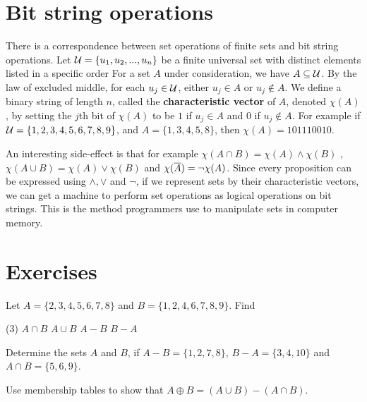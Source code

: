 \section{Bit string operations}
There is a correspondence between set operations of finite sets and bit string
operations. Let ${\cal {U}}=\{u_1, u_2, ..., u_n\}$ be a finite universal set with distinct 
elements listed in a specific  order
For a set $A$ under consideration, we have $A\subseteq {\cal {U}}$. By the law of excluded 
middle, for each $u_j\in {\cal {U}}$,
either $u_j\in A$ or $u_j\not\in A$. We define a binary string of length $n$, called 
the { \bfseries characteristic vector}\label{defn:char vector}
of $A$, denoted $\chi(A)$, by setting the $j$th bit of $\chi(A)$ to be $1$ if $u_j\in A$ 
and $0$ if $u_j\not\in A$.
For example if ${\cal {U}}=\{1,2,3,4,5,6,7,8,9\}$, and $A=\{1,3,4,5,8\}$, then $\chi(A)=101110010$. 

An interesting side-effect is that for example $\chi(A\cap B)=\chi(A)\wedge \chi(B)$ %
,
$\chi(A\cup B)=\chi(A)\vee \chi(B)$ and $\chi(\overline{A})=\neg \chi(A)$. Since 
every proposition can be expressed using $\wedge, \vee$ and $\neg$, 
if we represent sets by their characteristic vectors, 
we can get a machine
to perform set operations as logical operations on bit strings. This is the method programmers use
to manipulate sets in computer memory.

\clearpage



\section{Exercises}

\begin{exer}
Let $A=\{2,3,4,5,6,7,8\}$ and $B=\{1,2,4,6,7,8,9\}$. Find 
\begin{tasks}(3)
	\task $A\cap B$
	\task $A\cup B$
	\task $A-B$
	\task $B-A$
\end{tasks}
\end{exer}

\begin{exer}
Determine the sets $A$ and $B$, if $A-B=\{1,2,7,8\}$,\newline
$ B-A=\{3,4,10\}$ and $A\cap B=\{5, 6, 9\}$.
\end{exer}

\begin{exer}
Use membership tables to show that \newline
 $A\oplus B=(A\cup B)-(A\cap B)$.
\end{exer}

